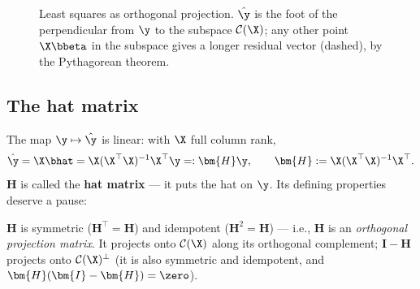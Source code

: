 \begin{figure}[htbp]
\centering
{}%
\caption{Least squares as orthogonal projection. $\hat{\y}$ is the foot of the perpendicular from $\y$ to the subspace $\mathcal{C}(\X)$; any other point $\X\bbeta$ in the subspace gives a longer residual vector (dashed), by the Pythagorean theorem.}
\label{fig:projection}
\end{figure}

\subsection{The hat matrix}

The map $\y \mapsto \hat{\y}$ is linear: with $\X$ full column rank,
\begin{equation}\label{eq:hat}
  \hat{\y} = \X \bhat = \X (\X^\top \X)^{-1} \X^\top \y =: \bm{H} \y,
  \qquad
  \bm{H} := \X (\X^\top \X)^{-1} \X^\top.
\end{equation}
$\bm{H}$ is called the \textbf{hat matrix} — it puts the hat on $\y$. Its defining properties deserve a pause:

\begin{lemma}\label{lem:hat}
$\bm{H}$ is symmetric ($\bm{H}^\top = \bm{H}$) and idempotent ($\bm{H}^2 = \bm{H}$) — i.e., $\bm{H}$ is an \emph{orthogonal projection matrix}. It projects onto $\mathcal{C}(\X)$ along its orthogonal complement; $\bm{I} - \bm{H}$ projects onto $\mathcal{C}(\X)^\perp$ (it is also symmetric and idempotent, and $\bm{H}(\bm{I}-\bm{H}) = \zero$).
\end{lemma}

